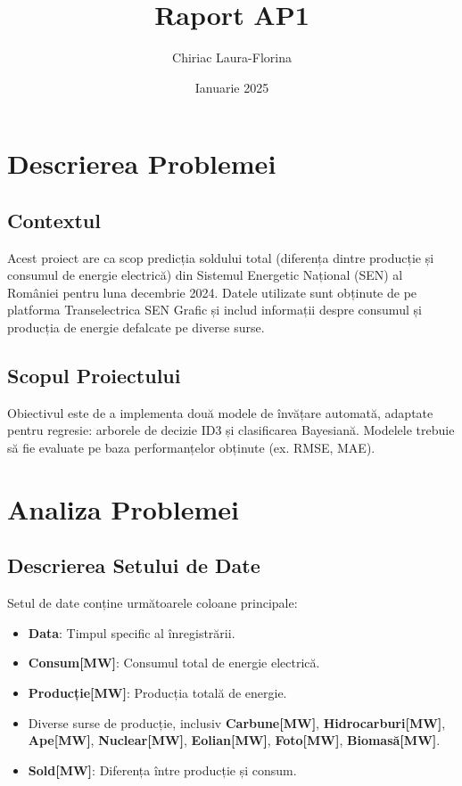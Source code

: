 \documentclass[a4paper,12pt]{article}
\title{Raport AP1}
\author{Chiriac Laura-Florina}
\date{Ianuarie 2025}
\begin{document}
\maketitle

\section{Descrierea Problemei}
\subsection{Contextul}
Acest proiect are ca scop predicția soldului total (diferența dintre producție și consumul de energie electrică) din Sistemul Energetic Național (SEN) al României pentru luna decembrie 2024. Datele utilizate sunt obținute de pe platforma Transelectrica SEN Grafic și includ informații despre consumul și producția de energie defalcate pe diverse surse.

\subsection{Scopul Proiectului}
Obiectivul este de a implementa două modele de învățare automată, adaptate pentru regresie: arborele de decizie ID3 și clasificarea Bayesiană. Modelele trebuie să fie evaluate pe baza performanțelor obținute (ex. RMSE, MAE).

\section{Analiza Problemei}
\subsection{Descrierea Setului de Date}
Setul de date conține următoarele coloane principale:
\begin{itemize}
    \item \textbf{Data}: Timpul specific al înregistrării.
    \item \textbf{Consum[MW]}: Consumul total de energie electrică.
    \item \textbf{Producție[MW]}: Producția totală de energie.
    \item Diverse surse de producție, inclusiv \textbf{Carbune[MW]}, \textbf{Hidrocarburi[MW]}, \textbf{Ape[MW]}, \textbf{Nuclear[MW]}, \textbf{Eolian[MW]}, \textbf{Foto[MW]}, \textbf{Biomasă[MW]}.
    \item \textbf{Sold[MW]}: Diferența între producție și consum.
\end{itemize}
\end{document}
